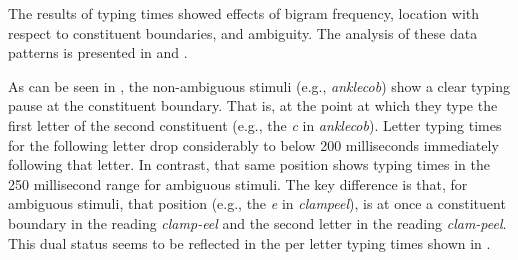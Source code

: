 \documentclass[output=paper]{langsci/langscibook}
\begin{document}
The results of typing times showed effects of bigram frequency, location with respect to constituent boundaries, and ambiguity.  The analysis of these data patterns is presented in  and .\largerpage

As can be seen in , the non-ambiguous stimuli (e.g., \textit{anklecob}) show a clear typing pause at the constituent boundary. That is, at the point at which they type the first letter of the second constituent (e.g., the \textit{c} in \textit{anklecob}). Letter typing times for the following letter drop considerably to below 200 milliseconds immediately following that letter. In contrast, that same position shows typing times in the 250 millisecond range for ambiguous stimuli. The key difference is that, for ambiguous stimuli, that position (e.g., the \textit{e} in \textit{clampeel}), is at once a constituent boundary in the reading \textit{clamp-eel} and the second letter in the reading \textit{clam-peel}. This dual status seems to be reflected in the per letter typing times shown in . 
\end{document}
